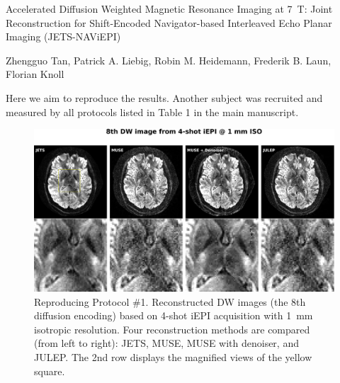 \documentclass[a4paper,11pt,twoside]{report}
\begin{document}

    \begin{center}
        {\Large Accelerated Diffusion Weighted Magnetic Resonance Imaging at 7~T: Joint Reconstruction for Shift-Encoded Navigator-based Interleaved Echo Planar Imaging (JETS-NAViEPI)}
    \end{center}

    \begin{center}
        Zhengguo Tan, Patrick A. Liebig, Robin M. Heidemann, Frederik B. Laun, Florian Knoll
    \end{center}

    \vspace{2em}

    Here we aim to reproduce the results.
    Another subject was recruited and measured by all protocols
    listed in Table 1 in the main manuscript.

    \newpage


    \begin{figure}[h]
        \includegraphics[width=\textwidth]{../figures/supp_fig1.png}
        \caption{Reproducing Protocol \#1.
        Reconstructed DW images
        (the 8th diffusion encoding)
        based on 4-shot iEPI acquisition with 1~mm isotropic resolution.
        Four reconstruction methods are compared (from left to right):
        JETS, MUSE, MUSE with denoiser, and JULEP.
        The 2nd row displays the magnified views of the yellow square.}
    \end{figure}
\end{document}

